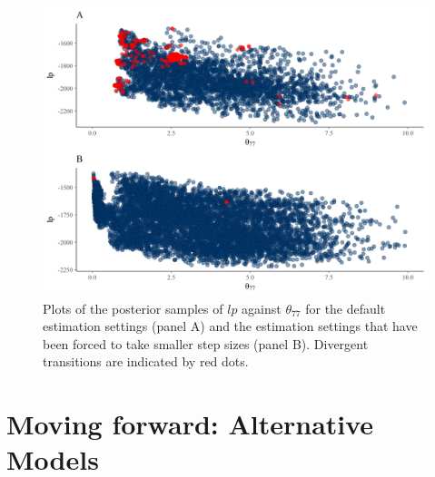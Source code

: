 \documentclass[openright,titlepage,12pt,a4paper]{book}
\begin{document}
\begin{figure}

{\centering \includegraphics[width=0.8\linewidth]{figures/chapter_5/Figure6} 

}

\caption{Plots of the posterior samples of $lp$ against $\theta_{77}$ for the default estimation settings (panel A) and the estimation settings that have been forced to take smaller step sizes (panel B). Divergent transitions are indicated by red dots. }\label{fig:ch05fig6}
\end{figure}

\hypertarget{moving-forward-alternative-models}{%
\section{Moving forward: Alternative Models}\label{moving-forward-alternative-models}}
\end{document}
